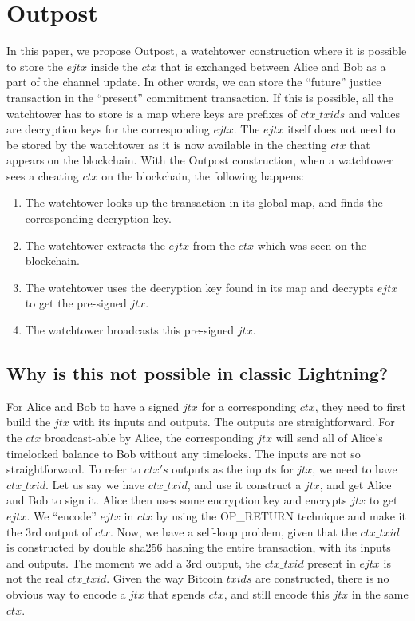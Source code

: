 \section{Outpost} %
In this paper, we propose Outpost, a watchtower construction where it is possible to store the $\mathit{ejtx}$ inside the $\mathit{ctx}$ that is exchanged between Alice and Bob as a part of the channel update. In other words, we can store the ``future'' justice transaction in the ``present'' commitment transaction. If this is possible, all the watchtower has to store is a map where keys are prefixes of $\mathit{ctx\_txids}$ and values are decryption keys for the corresponding $\mathit{ejtx}$. The $\mathit{ejtx}$ itself does not need to be stored by the watchtower as it is now available in the cheating $\mathit{ctx}$ that appears on the blockchain. With the Outpost construction, when a watchtower sees a cheating $\mathit{ctx}$ on the blockchain, the following happens:
\begin{enumerate}
\item The watchtower looks up the transaction in its global map, and finds the corresponding decryption key.
\item The watchtower extracts the $\mathit{ejtx}$ from the $\mathit{ctx}$ which was seen on the blockchain.
\item The watchtower uses the decryption key found in its map and decrypts $\mathit{ejtx}$ to get the pre-signed $\mathit{jtx}$.
\item The watchtower broadcasts this pre-signed $\mathit{jtx}$.
\end{enumerate}

\subsection{Why is this not possible in classic Lightning?}

For Alice and Bob to have a signed $\mathit{jtx}$ for a corresponding $\mathit{ctx}$, they need to first build the $\mathit{jtx}$ with its inputs and outputs. The outputs are straightforward. For the $\mathit{ctx}$ broadcast-able by Alice, the corresponding $\mathit{jtx}$ will send all of Alice's timelocked balance to Bob without any timelocks. The inputs are not so straightforward. To refer to $\mathit{ctx's}$ outputs as the inputs for $\mathit{jtx}$, we need to have $\mathit{ctx\_txid}$. Let us say we have $\mathit{ctx\_txid}$, and use it construct a $\mathit{jtx}$, and get Alice and Bob to sign it. Alice then uses some encryption key and encrypts $\mathit{jtx}$ to get $\mathit{ejtx}$. We ``encode'' $\mathit{ejtx}$ in $\mathit{ctx}$ by using the OP\_RETURN technique and make it the 3rd output of $\mathit{ctx}$. Now, we have a self-loop problem, given that the $\mathit{ctx\_txid}$ is constructed by double sha256 hashing the entire transaction, with its inputs and outputs. The moment we add a 3rd output, the $\mathit{ctx\_txid}$ present in $\mathit{ejtx}$ is not the real $\mathit{ctx\_txid}$. Given the way Bitcoin $\mathit{txids}$ are constructed, there is no obvious way to encode a $\mathit{jtx}$ that spends $\mathit{ctx}$, and still encode this $\mathit{jtx}$ in the same $\mathit{ctx}$.

